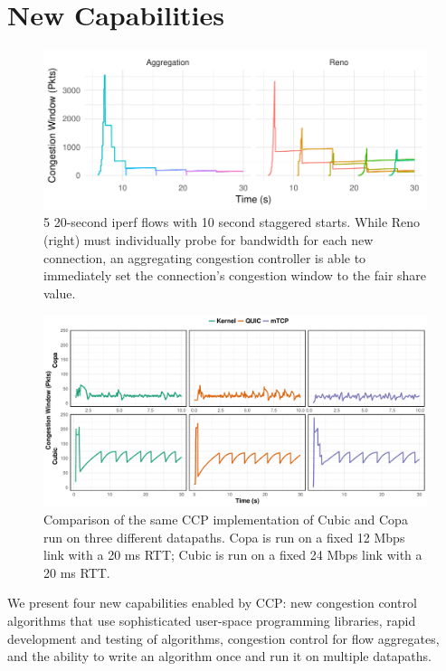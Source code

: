 \section{New Capabilities}
\label{s:capabilities}
 \begin{figure}
    \centering
    \includegraphics[width=\columnwidth]{img/stair}
    \caption{5 20-second iperf flows with 10 second staggered starts. While Reno (right) must individually probe for bandwidth for each new connection, an aggregating congestion controller is able to immediately set the connection's congestion window to the fair share value.}
    \label{fig:cap:agg}
\end{figure}
\begin{figure}[t!]
    \centering
    \includegraphics[width=2\columnwidth]{img/wora}
    \caption{Comparison of the same CCP implementation of Cubic and Copa run on three different datapaths. Copa is run on a fixed 12 Mbps link with a 20 ms RTT; Cubic is run on a fixed 24 Mbps link with a 20 ms RTT.}\label{fig:datapaths:wora}
\end{figure}
We present four new capabilities enabled by CCP: new congestion control algorithms that use sophisticated user-space programming libraries, rapid development and testing of algorithms, congestion control for flow aggregates, and the ability to write an algorithm once and run it on multiple datapaths.

